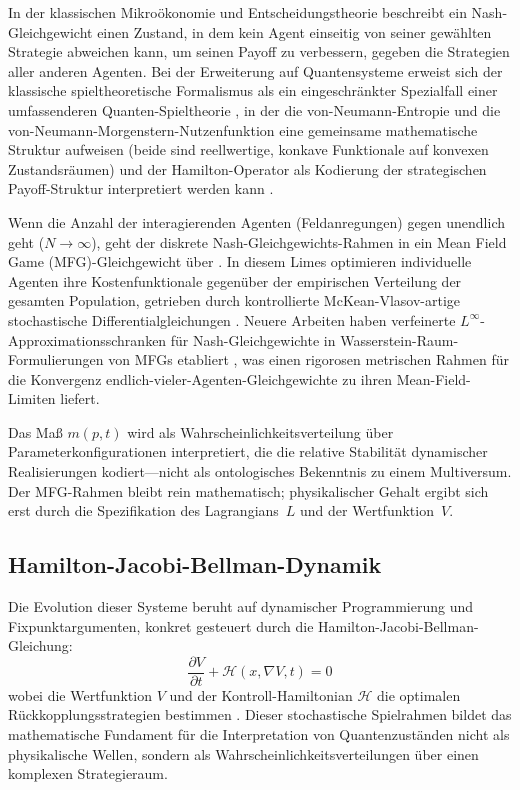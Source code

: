 \documentclass[12pt,a4paper]{article}
\theoremstyle{remark}
\begin{document}
In der klassischen Mikro\"okonomie und Entscheidungstheorie beschreibt ein Nash-Gleichgewicht \citep{Nash1950} einen Zustand, in dem kein Agent einseitig von seiner gew\"ahlten Strategie abweichen kann, um seinen Payoff zu verbessern, gegeben die Strategien aller anderen Agenten. Bei der Erweiterung auf Quantensysteme erweist sich der klassische spieltheoretische Formalismus als ein eingeschr\"ankter Spezialfall einer umfassenderen Quanten-Spieltheorie \citep{QuantumOptimization}, in der die von-Neumann-Entropie und die von-Neumann-Morgenstern-Nutzenfunktion eine gemeinsame mathematische Struktur aufweisen (beide sind reellwertige, konkave Funktionale auf konvexen Zustandsr\"aumen) und der Hamilton-Operator als Kodierung der strategischen Payoff-Struktur interpretiert werden kann \citep{Abel2023,QuantumOptimization}.

Wenn die Anzahl der interagierenden Agenten (Feldanregungen) gegen unendlich geht ($N \to \infty$), geht der diskrete Nash-Gleichgewichts-Rahmen in ein Mean Field Game (MFG)-Gleichgewicht \"uber \citep{LasryLions2007}. In diesem Limes optimieren individuelle Agenten ihre Kostenfunktionale gegen\"uber der empirischen Verteilung der gesamten Population, getrieben durch kontrollierte McKean-Vlasov-artige stochastische Differentialgleichungen \citep{LasryLions2006}. Neuere Arbeiten haben verfeinerte $L^\infty$-Approximationsschranken f\"ur Nash-Gleichgewichte in Wasserstein-Raum-Formulierungen von MFGs etabliert \cite{DjeteTouzi2026}, was einen rigorosen metrischen Rahmen f\"ur die Konvergenz endlich-vieler-Agenten-Gleichgewichte zu ihren Mean-Field-Limiten liefert.

Das Ma\ss{} $m(p,t)$ wird als Wahrscheinlichkeitsverteilung \"uber Parameterkonfigurationen interpretiert, die die relative Stabilit\"at dynamischer Realisierungen kodiert---nicht als ontologisches Bekenntnis zu einem Multiversum. Der MFG-Rahmen bleibt rein mathematisch; physikalischer Gehalt ergibt sich erst durch die Spezifikation des Lagrangians~$L$ und der Wertfunktion~$V$.

\subsection{Hamilton-Jacobi-Bellman-Dynamik}

Die Evolution dieser Systeme beruht auf dynamischer Programmierung und Fixpunktargumenten, konkret gesteuert durch die Hamilton-Jacobi-Bellman-Gleichung:
\begin{equation}
\frac{\partial V}{\partial t} + \mathcal{H}\left(x, \nabla V, t\right) = 0
\end{equation}
wobei die Wertfunktion $V$ und der Kontroll-Hamiltonian $\mathcal{H}$ die optimalen R\"uckkopplungsstrategien bestimmen \citep{LasryLions2007}. Dieser stochastische Spielrahmen bildet das mathematische Fundament f\"ur die Interpretation von Quantenzust\"anden nicht als physikalische Wellen, sondern als Wahrscheinlichkeitsverteilungen \"uber einen komplexen Strategieraum.
\end{document}
